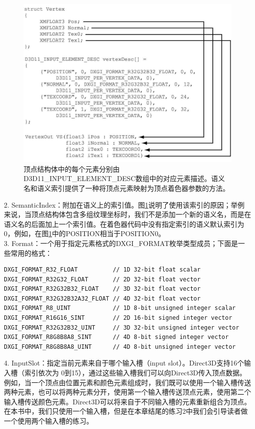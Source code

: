\documentclass[11pt,a4paper,oldfontcommands]{memoir}
\begin{document}
{\begin{flushleft}
\begin{figure}[h]
    \includegraphics[width=\textwidth]{6-1}
	\centering
	\caption{顶点结构体中的每个元素分别由D3D11\_INPUT\_ELEMENT\_DESC数组中的对应元素描述。语义名和语义索引提供了一种将顶点元素映射为顶点着色器参数的方法。}
	\label{fig:6-1}
\end{figure}
2. SemanticIndex：附加在语义上的索引值。图\ref{fig:6-1}说明了使用该索引的原因；举例来说，当顶点结构体包含多组纹理坐标时，我们不是添加一个新的语义名，而是在语义名的后面加上一个索引值。在着色器代码中没有指定索引的语义默认索引为0，例如，在图\ref{fig:6-1}中的POSITION相当于POSITION0。\\
3. Format：一个用于指定元素格式的DXGI\_FORMAT枚举类型成员；下面是一些常用的格式：
\begin{lstlisting}
DXGI_FORMAT_R32_FLOAT          // 1D 32-bit float scalar
DXGI_FORMAT_R32G32_FLOAT       // 2D 32-bit float vector
DXGI_FORMAT_R32G32B32_FLOAT    // 3D 32-bit float vector
DXGI_FORMAT_R32G32B32A32_FLOAT // 4D 32-bit float vector
DXGI_FORMAT_R8_UINT            // 1D 8-bit unsigned integer scalar
DXGI_FORMAT_R16G16_SINT        // 2D 16-bit signed integer vector
DXGI_FORMAT_R32G32B32_UINT     // 3D 32-bit unsigned integer vector
DXGI_FORMAT_R8G8B8A8_SINT      // 4D 8-bit signed integer vector
DXGI_FORMAT_R8G8B8A8_UINT      // 4D 8-bit unsigned integer vector
\end{lstlisting}
4. InputSlot：指定当前元素来自于哪个输入槽（input slot）。Direct3D支持16个输入槽（索引依次为 0到15），通过这些输入槽我们可以向Direct3D传入顶点数据。例如，当一个顶点由位置元素和颜色元素组成时，我们既可以使用一个输入槽传送两种元素，也可以将两种元素分开，使用第一个输入槽传送顶点元素，使用第二个输入槽传送颜色元素。Direct3D可以将来自于不同输入槽的元素重新组合为顶点。在本书中，我们只使用一个输入槽，但是在本章结尾的练习2中我们会引导读者做一个使用两个输入槽的练习。\\

\end{flushleft}}
\end{document}
